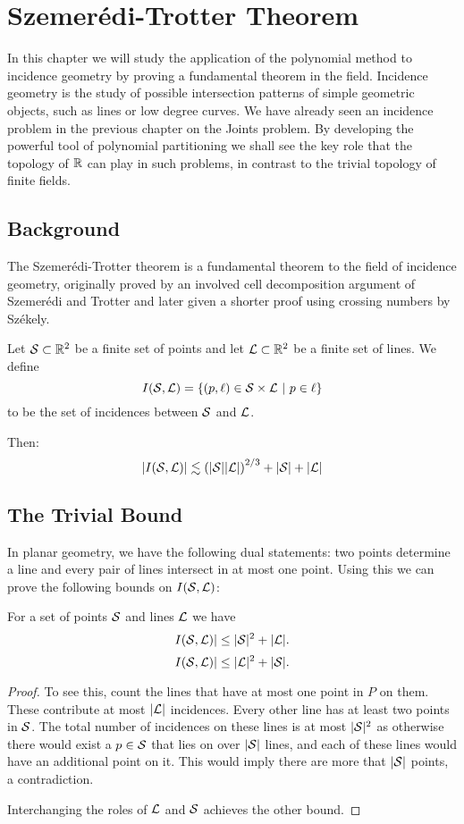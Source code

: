 \chapter{Szemerédi-Trotter Theorem}

In this chapter we will study the application of the polynomial method to incidence geometry by proving a fundamental theorem in the field.
Incidence geometry is the study of possible intersection patterns of simple geometric objects, such as lines or low degree curves. 
We have already seen an incidence problem in the previous chapter on the Joints problem. 
By developing the powerful tool of polynomial partitioning we shall see the key role that the topology of $\mathbb R$ can play in such problems, 
in contrast to the trivial topology of finite fields. 


\section{Background}
The Szemerédi-Trotter theorem is a fundamental theorem to the field of incidence geometry, originally proved by an involved cell decomposition argument
of Szemerédi and Trotter and later given a shorter proof using crossing numbers by Székely. 
\begin{theorem}
    Let $\mathcal S \subset\mathbb R^2$ be a finite set of points and
    let $\mathcal L \subset \mathbb R^2$ be a finite set of lines. We define 
    \[I(\ES,\LL) = \{(p, \ell) \in \ES \times \LL \ | \ p \in \ell\}\] 
    to be the set of incidences between $\mathcal S$ and $\mathcal L$. 
   
    Then:
    \[
        |I(\mathcal S, \mathcal L)| \lesssim \left(|\mathcal S||\mathcal L|\right)^{2/3} + |\mathcal S| + |\mathcal L|
    \]
    \label{thm:S-T}
\end{theorem}

\section{The Trivial Bound}
In planar geometry, we have the following dual statements: two points determine a line and every pair of lines intersect in at most one point.
Using this we can prove the following bounds on $I(\mathcal S,\mathcal L)$:
\begin{theorem}
    For a set of points $\mathcal S$ and lines $\mathcal L$ we have
    \[I(\mathcal S,\mathcal L)| \leq |\mathcal S|^2 + |\mathcal L|. \]
    \[I(\mathcal S,\mathcal L)| \leq |\mathcal L|^2 + |\mathcal S|. \]
    \label{thm:trivial-ST-bounds}
\end{theorem}
\begin{proof}

To see this, count the lines that have at most one point in $P$ on them. These contribute at most $|\mathcal L|$ incidences.
Every other line has at least two points in $\mathcal S$. The total number of incidences on these lines is at most $|\mathcal S|^2$
as otherwise there would exist a $p\in \mathcal S$ that lies on over $|\mathcal S|$ lines, and each of these lines would have an additional 
point on it. This would imply there are more that $|\mathcal S|$ points, a contradiction. 

Interchanging the roles of $\mathcal L$ and $\mathcal S$ achieves the other bound. 
\end{proof}

